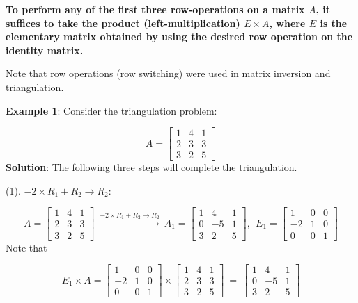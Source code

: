 \documentclass[
]{book}
\begin{document}
\hfill\break

\textbf{\color{red}\LARGE To perform any of the first three row-operations on a matrix \(A\), it suffices to take the product (left-multiplication) \(E\times A\), where \(E\) is the elementary matrix obtained by using the desired row operation on the identity matrix.}

\hfill\break

Note that row operations (row switching) were used in matrix inversion and triangulation.

\textbf{Example 1}: Consider the triangulation problem:

\[
A= \left[\begin{array}{ccccc} 
1 & 4 & 1   \\ 
2 & 3 & 3  \\ 
3 & 2 & 5  
\end{array}
\right]
\]
\textbf{Solution}: The following three steps will complete the triangulation.

(1). \(-2\times R_1 + R_2 \to R_2\):

\[
A= \left[\begin{array}{ccccc} 
1 & 4 & 1   \\ 
2 & 3 & 3  \\ 
3 & 2 & 5  
\end{array}
\right]
~
\xrightarrow{-2\times R_1 + R_2 \to R_2}
~
A_1= \left[\begin{array}{ccccc} 
1 & 4 & 1   \\ 
0 & -5 & 1  \\ 
3 & 2 & 5  
\end{array}
\right],
~~
E_1 =\left[\begin{array}{ccccc} 
1 & 0 & 0   \\ 
-2 & 1 & 0  \\ 
0 & 0 & 1  
\end{array}
\right]
\]
Note that

\[
E_1\times A = \left[\begin{array}{ccccc} 
1 & 0 & 0   \\ 
-2 & 1 & 0  \\ 
0 & 0 & 1  
\end{array}
\right]
\times
\left[\begin{array}{ccccc} 
1 & 4 & 1   \\ 
2 & 3 & 3  \\ 
3 & 2 & 5  
\end{array}
\right]
~=~
\left[\begin{array}{ccccc} 
1 & 4 & 1   \\ 
0 & -5 & 1  \\ 
3 & 2 & 5  
\end{array}
\right]
\]
\end{document}
